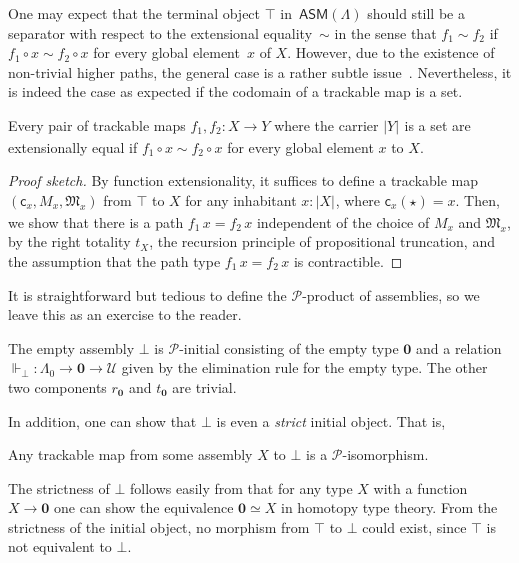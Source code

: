 \documentclass[a4paper,UKenglish,numberwithinsect,cleveref,thm-restate]{lipics-v2021}
\newcommand{\eqv}[2]{\ensuremath{#1 \simeq #2}\xspace}
\newcommand{\tproj}[3][]{\mathopen{}\left|#3\right|_{#2}^{#1}\mathclose{}}
\newcommand{\bproj}[1]{\tproj{}{#1}}
\newcommand{\PP}{\mathscr{P}}
\newcommand{\ASM}{\mathsf{ASM}}
\newcommand{\Univ}{\mathcal{U}}
\newcommand{\Empty}{\mathbf{0}}
\theoremstyle{plain}
\begin{document}
One may expect that the terminal object $\top$ in~$\ASM(\Lambda)$ should still be a separator with respect to the extensional equality~$\sim$ in the sense that $f_1 \sim f_2$ if $f_1 \circ x \sim f_2 \circ x$ for every global element~$x$ of $X$.
However, due to the existence of non-trivial higher paths, the general case is a rather subtle issue~\cite{Kraus2015}. 
Nevertheless, it is indeed the case as expected if the codomain of a trackable map is a set. 
\begin{proposition}
  Every pair of trackable maps $f_1, f_2 : X \to Y$ where the carrier $\bproj{Y}$ is a set are extensionally equal if $f_1 \circ x \sim f_2 \circ x$ for every global element $x$ to $X$. 
\end{proposition}
\begin{proof}[Proof sketch]
  By function extensionality, it suffices to define a trackable map $(\mathsf{c}_x, M_x, \mathfrak{M}_x)$ from $\top$ to $X$ for any inhabitant $x : \bproj{X}$, where $\mathsf{c}_x(\star) = x$.
  Then, we show that there is a path $f_1\,x = f_2\,x$ independent of the choice of $M_x$ and $\mathfrak{M}_x$, by the right totality $t_X$, the recursion principle of propositional truncation, and the assumption that the path type $f_1\,x = f_2\,x$ is contractible. 
\end{proof}

It is straightforward but tedious to define the $\PP$-product of assemblies, so we leave this as an exercise to the reader. 
\begin{example}
The empty assembly $\bot$ is $\PP$-initial consisting of the empty type $\Empty$ and a relation $\Vdash_\bot : \Lambda_0 \to \Empty \to \Univ$ given by the elimination rule for the empty type.
The other two components $r_\Empty$ and $t_\Empty$ are trivial.
\end{example}

In addition, one can show that $\bot$ is even a \emph{strict} initial object. That is, 
\begin{proposition}\label{prop:strict-initial}
  Any trackable map from some assembly $X$ to $\bot$ is a $\PP$-isomorphism. 
\end{proposition}
The strictness of $\bot$ follows easily from that for any type $X$ with a function $X \to \Empty$ one can show the equivalence $\eqv{\Empty}{X}$ in homotopy type theory.
From the strictness of the initial object, no morphism from $\top$ to $\bot$ could exist, since $\top$ is not equivalent to $\bot$.
\end{document}
